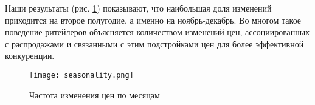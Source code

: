 Наши результаты (рис. \ref{fig:seasonality}) показывают, что наибольшая доля изменений приходится на второе полугодие, а именно на ноябрь-декабрь. Во многом такое поведение ритейлеров объясняется количеством изменений цен, ассоциированных с распродажами и связанными с этим подстройками цен для более эффективной конкуренции.

\begin{figure}[h]
	\centering
	\texttt{[image: seasonality.png]} %
	\caption{Частота изменения цен по месяцам} %
	\label{fig:seasonality} %
\end{figure}
 



